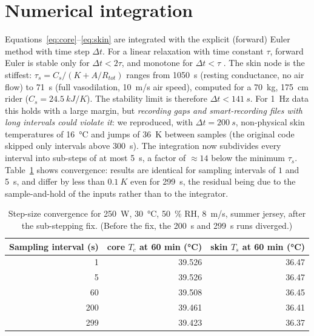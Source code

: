 \documentclass[11pt,a4paper]{article}
\begin{document}
\section{Numerical integration}
\label{sec:numerics}
Equations~\eqref{eq:core}--\eqref{eq:skin} are integrated with the explicit (forward) Euler method with time step \(\Delta t\). For a linear relaxation with time constant \(\tau\), forward Euler is stable only for \(\Delta t<2\tau\), and monotone for \(\Delta t<\tau\) \citep{hairer1993}. The skin node is the stiffest: \(\tau_s=C_s/(K+A/R_{tot})\) ranges from \SI{1050}{s} (resting conductance, no air flow) to \SI{71}{s} (full vasodilation, \SI{10}{m/s} air speed), computed for a \SI{70}{kg}, \SI{175}{cm} rider (\(C_s=\SI{24.5}{kJ/K}\)). The stability limit is therefore \(\Delta t<\SI{141}{s}\). For \SI{1}{Hz} data this holds with a large margin, but \emph{recording gaps and smart-recording files with long intervals could violate it}: we reproduced, with \(\Delta t=\SI{200}{s}\), non-physical skin temperatures of \SI{16}{\degreeCelsius} and jumps of \SI{36}{K} between samples (the original code skipped only intervals above \SI{300}{s}). The integration now subdivides every interval into sub-steps of at most \SI{5}{s}, a factor of \(\approx14\) below the minimum \(\tau_s\). Table~\ref{tab:conv} shows convergence: results are identical for sampling intervals of \(1\) and \SI{5}{s}, and differ by less than \(0.1\ \si{K}\) even for \SI{299}{s}, the residual being due to the sample-and-hold of the inputs rather than to the integrator.

\begin{table}[H]
\centering\small
\begin{tabular}{@{}rrr@{}}
\toprule
Sampling interval (s) & core \(T_c\) at 60 min (\si{\degreeCelsius}) & skin \(T_s\) at 60 min (\si{\degreeCelsius}) \\
\midrule
1 & 39.526 & 36.47 \\
5 & 39.526 & 36.47 \\
60 & 39.508 & 36.45 \\
200 & 39.461 & 36.41 \\
299 & 39.423 & 36.37 \\
\bottomrule
\end{tabular}
\caption{Step-size convergence for \SI{250}{W}, \SI{30}{\degreeCelsius}, \SI{50}{\percent} RH, \SI{8}{m/s}, summer jersey, after the sub-stepping fix. (Before the fix, the \SI{200}{s} and \SI{299}{s} runs diverged.)}\label{tab:conv}
\end{table}
\end{document}
